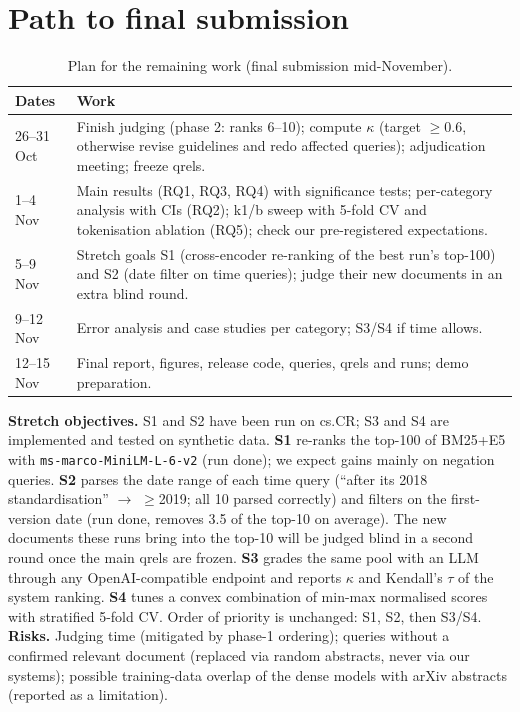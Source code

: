 \documentclass[10pt,a4paper]{article}
\begin{document}
\FloatBarrier
\section{Path to final submission}\label{sec:path}
\begin{table}[H]
\centering\small
\caption{Plan for the remaining work (final submission mid-November).}
\begin{tabularx}{\linewidth}{@{}l X@{}}
\toprule
Dates & Work\\
\midrule
26--31 Oct & Finish judging (phase 2: ranks 6--10); compute $\kappa$ (target $\geq 0.6$, otherwise
revise guidelines and redo affected queries); adjudication meeting; freeze qrels.\\
1--4 Nov & Main results (RQ1, RQ3, RQ4) with significance tests; per-category analysis with CIs (RQ2);
k1/b sweep with 5-fold CV and tokenisation ablation (RQ5); check our pre-registered expectations.\\
5--9 Nov & Stretch goals S1 (cross-encoder re-ranking of the best run's top-100) and S2
(date filter on time queries); judge their new documents in an extra blind round.\\
9--12 Nov & Error analysis and case studies per category; S3/S4 if time allows.\\
12--15 Nov & Final report, figures, release code, queries, qrels and runs; demo preparation.\\
\bottomrule
\end{tabularx}
\end{table}
\textbf{Stretch objectives.} S1 and S2 have been run on cs.CR; S3 and S4 are implemented and tested
on synthetic data. \textbf{S1} re-ranks the top-100 of BM25+E5 with \texttt{ms-marco-MiniLM-L-6-v2}
(run done); we expect gains mainly on negation queries. \textbf{S2} parses the date range of each
time query (``after its 2018 standardisation'' $\to$ $\geq$2019; all 10 parsed correctly) and filters
on the first-version date (run done, removes 3.5 of the top-10 on average). The new documents these
runs bring into the top-10 will be judged blind in a second round once the main qrels are frozen. \textbf{S3} grades the same pool with an
LLM through any OpenAI-compatible endpoint and reports $\kappa$ and Kendall's $\tau$ of the system
ranking. \textbf{S4} tunes a convex combination of min-max normalised scores with stratified
5-fold CV. Order of priority is unchanged: S1, S2, then S3/S4.
\textbf{Risks.} Judging time (mitigated by phase-1 ordering); queries without a confirmed relevant
document (replaced via random abstracts, never via our systems); possible training-data overlap
of the dense models with arXiv abstracts (reported as a limitation).
\end{document}
